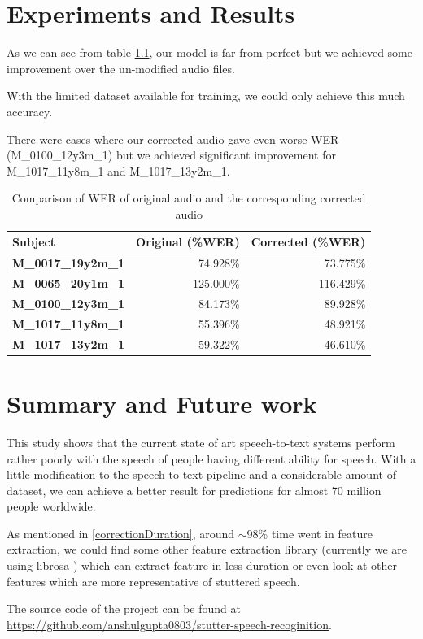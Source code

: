 \documentclass{report}
\begin{document}
\chapter{Experiments and Results}
As we can see from table \ref{table:werComparision}, our model is far from perfect but we achieved some improvement over the un-modified audio files.

With the limited dataset available for training, we could only achieve this much accuracy.

There were cases where our corrected audio gave even worse WER (M\_0100\_12y3m\_1) but we achieved significant improvement for M\_1017\_11y8m\_1 and M\_1017\_13y2m\_1.

\begin{table}[ht]
\centering
\caption{Comparison of WER of original audio and the corresponding corrected audio}
\label{table:werComparision}
\begin{tabular}{|l|r|r|}
\hline
\textbf{Subject}           & \multicolumn{1}{l|}{\textbf{Original (\%WER)}} & \multicolumn{1}{l|}{\textbf{Corrected (\%WER)}} \\ \hline
\textbf{M\_0017\_19y2m\_1} & 74.928\%                                       & 73.775\%                                        \\ \hline
\textbf{M\_0065\_20y1m\_1} & 125.000\%                                      & 116.429\%                                       \\ \hline
\textbf{M\_0100\_12y3m\_1} & 84.173\%                                       & 89.928\%                                        \\ \hline
\textbf{M\_1017\_11y8m\_1} & 55.396\%                                       & 48.921\%                                        \\ \hline
\textbf{M\_1017\_13y2m\_1} & 59.322\%                                       & 46.610\%                                        \\ \hline
\end{tabular}
\end{table}

\chapter{Summary and Future work}
This study shows that the current state of art speech-to-text systems perform rather poorly with the speech of people having different ability for speech. With a little modification to the speech-to-text pipeline and a considerable amount of dataset, we can achieve a better result for predictions for almost 70 million people worldwide.

As mentioned in \ref{correctionDuration}, around $\sim$98\% time went in feature extraction, we could find some other feature extraction library (currently we are using librosa \cite{librosa}) which can extract feature in less duration or even look at other features which are more representative of stuttered speech.

The source code of the project can be found at \href{https://github.com/anshulgupta0803/stutter-speech-recoginition}{https://github.com/anshulgupta0803/stutter-speech-recoginition}.




\end{document}
